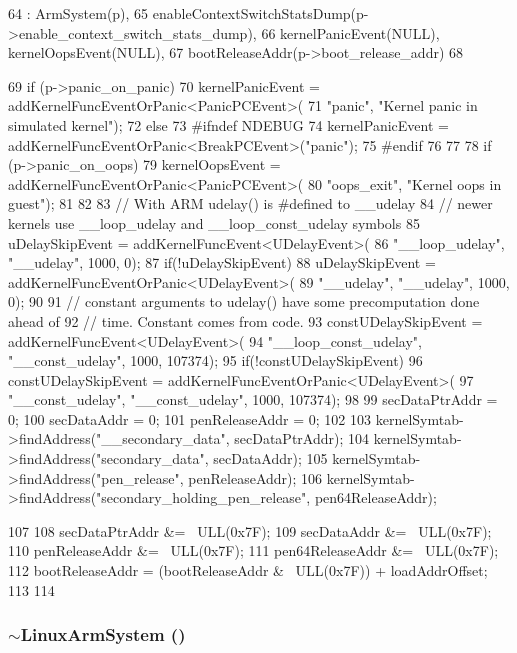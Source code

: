\begin{DoxyCode}
64     : ArmSystem(p),
65       enableContextSwitchStatsDump(p->enable_context_switch_stats_dump),
66       kernelPanicEvent(NULL), kernelOopsEvent(NULL),
67       bootReleaseAddr(p->boot_release_addr)
68 {
69     if (p->panic_on_panic) {
70         kernelPanicEvent = addKernelFuncEventOrPanic<PanicPCEvent>(
71             "panic", "Kernel panic in simulated kernel");
72     } else {
73 #ifndef NDEBUG
74         kernelPanicEvent = addKernelFuncEventOrPanic<BreakPCEvent>("panic");
75 #endif
76     }
77 
78     if (p->panic_on_oops) {
79         kernelOopsEvent = addKernelFuncEventOrPanic<PanicPCEvent>(
80             "oops_exit", "Kernel oops in guest");
81     }
82 
83     // With ARM udelay() is #defined to __udelay
84     // newer kernels use __loop_udelay and __loop_const_udelay symbols
85     uDelaySkipEvent = addKernelFuncEvent<UDelayEvent>(
86         "__loop_udelay", "__udelay", 1000, 0);
87     if(!uDelaySkipEvent)
88         uDelaySkipEvent = addKernelFuncEventOrPanic<UDelayEvent>(
89          "__udelay", "__udelay", 1000, 0);
90 
91     // constant arguments to udelay() have some precomputation done ahead of
92     // time. Constant comes from code.
93     constUDelaySkipEvent = addKernelFuncEvent<UDelayEvent>(
94         "__loop_const_udelay", "__const_udelay", 1000, 107374);
95     if(!constUDelaySkipEvent)
96         constUDelaySkipEvent = addKernelFuncEventOrPanic<UDelayEvent>(
97          "__const_udelay", "__const_udelay", 1000, 107374);
98 
99     secDataPtrAddr = 0;
100     secDataAddr = 0;
101     penReleaseAddr = 0;
102 
103     kernelSymtab->findAddress("__secondary_data", secDataPtrAddr);
104     kernelSymtab->findAddress("secondary_data", secDataAddr);
105     kernelSymtab->findAddress("pen_release", penReleaseAddr);
106     kernelSymtab->findAddress("secondary_holding_pen_release", pen64ReleaseAddr);
      
107 
108     secDataPtrAddr &= ~ULL(0x7F);
109     secDataAddr &= ~ULL(0x7F);
110     penReleaseAddr &= ~ULL(0x7F);
111     pen64ReleaseAddr &= ~ULL(0x7F);
112     bootReleaseAddr = (bootReleaseAddr & ~ULL(0x7F)) + loadAddrOffset;
113 
114 }
\end{DoxyCode}
\hypertarget{classLinuxArmSystem_a3e10e01606ed67da6f24837440bfb69f}{
\subsubsection[{$\sim$LinuxArmSystem}]{\setlength{\rightskip}{0pt plus 5cm}$\sim${\bf LinuxArmSystem} ()}}
\label{classLinuxArmSystem_a3e10e01606ed67da6f24837440bfb69f}



